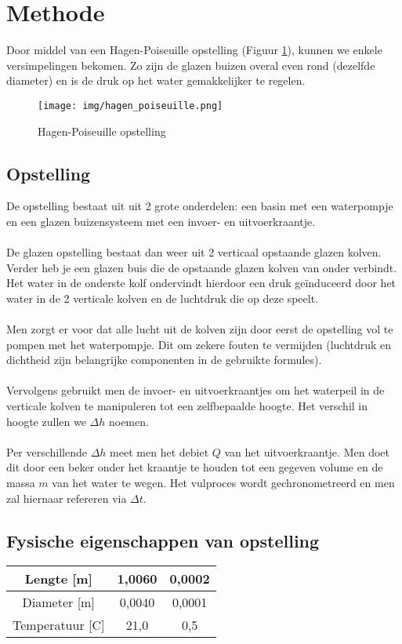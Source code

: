 \section{Methode}

Door middel van een Hagen-Poiseuille opstelling
(Figuur \ref{fig:hagen-pois}), kunnen we enkele
versimpelingen bekomen. Zo zijn de glazen buizen
overal even rond (dezelfde diameter) en is de druk
op het water gemakkelijker te regelen.

\begin{figure}[h]
    \centering
    \caption{Hagen-Poiseuille opstelling}
    \texttt{[image: img/hagen\_poiseuille.png]}
    \label{fig:hagen-pois}
\end{figure}

\subsection{Opstelling}

De opstelling bestaat uit uit 2 grote onderdelen: een basin
met een waterpompje en een glazen buizensysteem met
een invoer- en uitvoerkraantje.
\\ \\
De glazen opstelling bestaat dan weer uit 2 verticaal
opstaande glazen kolven. Verder heb je een glazen buis
die de opstaande glazen kolven van onder verbindt.
Het water in de onderste kolf ondervindt hierdoor een druk
geïnduceerd door het water in de 2 verticale kolven en de
luchtdruk die op deze speelt.
\\ \\
Men zorgt er voor dat alle lucht uit de kolven zijn door
eerst de opstelling vol te pompen met het waterpompje.
Dit om zekere fouten te vermijden (luchtdruk en dichtheid
zijn belangrijke componenten in de gebruikte formules).
\\ \\
Vervolgens gebruikt men de invoer- en uitvoerkraantjes om
het waterpeil in de verticale kolven te manipuleren tot
een zelfbepaalde hoogte. Het verschil in hoogte zullen we
$\Delta h$ noemen.
\\ \\
Per verschillende $\Delta h$ meet men het debiet $Q$ van het
uitvoerkraantje. Men doet dit door een beker onder het
kraantje te houden tot een gegeven volume en de massa $m$ van
het water te wegen. Het vulproces wordt gechronometreerd
en men zal hiernaar refereren via $\Delta t$.

\subsection{Fysische eigenschappen van opstelling}

\begin{table}
    \begin{tabular}{| c | c | c |}
        \hline
        
        Lengte [m]      & 1,0060    & 0,0002 \\ \hline
        Diameter [m]    & 0,0040    & 0,0001 \\ \hline
        Temperatuur [C] & 21,0      & 0,5    \\ \hline
        
    \end{tabular}
\end{table}
